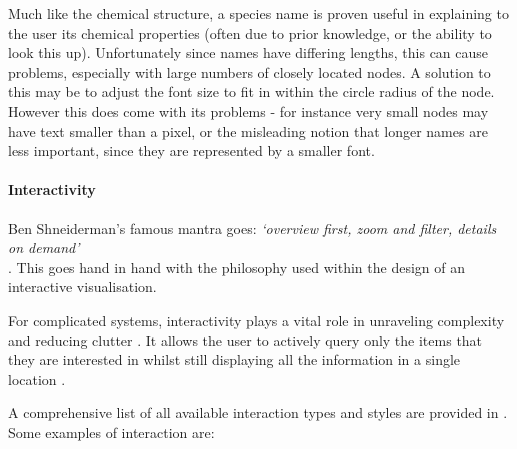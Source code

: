 Much like the chemical structure, a species name is proven useful in explaining to the user its chemical properties (often due to prior knowledge, or the ability to look this up). Unfortunately since names have differing lengths, this can cause problems, especially with large numbers of closely located nodes. A solution to this may be to adjust the font size to fit in within the circle radius of the node. However this does come with its problems - for instance very small nodes may have text smaller than a pixel, or the misleading notion that longer names are less important, since they are represented by a smaller font. 


\paragraph*{\color{c3}Interactivity}

Ben Shneiderman's famous mantra goes: \emph{`overview first, zoom and filter, details on demand'} \\ \cite{mantra}. This goes hand in hand with the philosophy used within the design of an interactive visualisation.

For complicated systems, interactivity plays a vital role in unraveling complexity and reducing clutter \cite{interaction1}. It allows the user to actively query only the items that they are interested in whilst still displaying all the information in a single location \cite{oneplace}. 

A comprehensive list of all available interaction types and styles are provided in \cite{ch6}. Some examples of interaction are:\\ 

